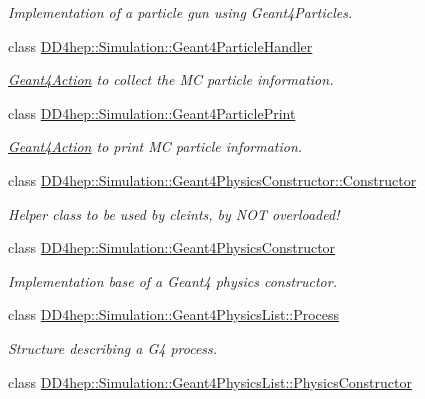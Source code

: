 \begin{DoxyCompactItemize}
\begin{DoxyCompactList}\small\item\em Implementation of a particle gun using Geant4\+Particles. \end{DoxyCompactList}\item 
class \hyperlink{class_d_d4hep_1_1_simulation_1_1_geant4_particle_handler}{D\+D4hep\+::\+Simulation\+::\+Geant4\+Particle\+Handler}
\begin{DoxyCompactList}\small\item\em \hyperlink{class_d_d4hep_1_1_simulation_1_1_geant4_action}{Geant4\+Action} to collect the MC particle information. \end{DoxyCompactList}\item 
class \hyperlink{class_d_d4hep_1_1_simulation_1_1_geant4_particle_print}{D\+D4hep\+::\+Simulation\+::\+Geant4\+Particle\+Print}
\begin{DoxyCompactList}\small\item\em \hyperlink{class_d_d4hep_1_1_simulation_1_1_geant4_action}{Geant4\+Action} to print MC particle information. \end{DoxyCompactList}\item 
class \hyperlink{class_d_d4hep_1_1_simulation_1_1_geant4_physics_constructor_1_1_constructor}{D\+D4hep\+::\+Simulation\+::\+Geant4\+Physics\+Constructor\+::\+Constructor}
\begin{DoxyCompactList}\small\item\em Helper class to be used by cleints, by N\+OT overloaded! \end{DoxyCompactList}\item 
class \hyperlink{class_d_d4hep_1_1_simulation_1_1_geant4_physics_constructor}{D\+D4hep\+::\+Simulation\+::\+Geant4\+Physics\+Constructor}
\begin{DoxyCompactList}\small\item\em Implementation base of a Geant4 physics constructor. \end{DoxyCompactList}\item 
class \hyperlink{class_d_d4hep_1_1_simulation_1_1_geant4_physics_list_1_1_process}{D\+D4hep\+::\+Simulation\+::\+Geant4\+Physics\+List\+::\+Process}
\begin{DoxyCompactList}\small\item\em Structure describing a G4 process. \end{DoxyCompactList}\item 
class \hyperlink{class_d_d4hep_1_1_simulation_1_1_geant4_physics_list_1_1_physics_constructor}{D\+D4hep\+::\+Simulation\+::\+Geant4\+Physics\+List\+::\+Physics\+Constructor}

\end{DoxyCompactItemize}

